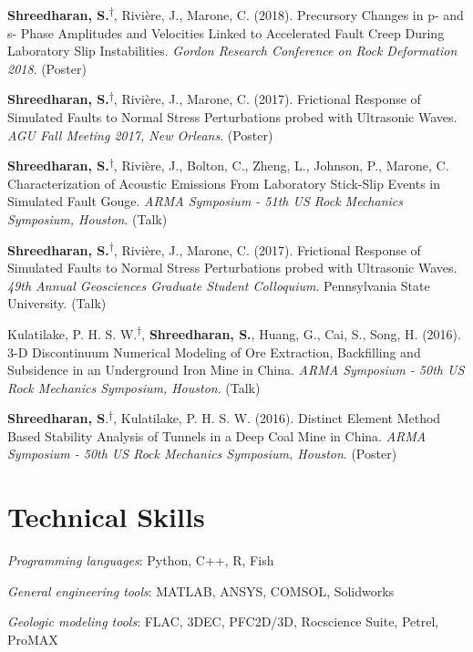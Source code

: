 \documentclass[11pt,letterpaper]{article}
\renewenvironment{itemize}{
  \begin{list}{}{
      \setlength{\leftmargin}{1.5em}
      \setlength{\itemsep}{0.25em}
      \setlength{\parskip}{0pt}
      \setlength{\parsep}{0.25em}
    }
}{
  \end{list}
}
\begin{document}
\begin{etaremune}
    \item {\bf Shreedharan, S.}\textsuperscript{$\dagger$}, Rivi\`ere, J., Marone, C. (2018). Precursory Changes in p- and s- Phase Amplitudes and Velocities Linked to Accelerated Fault Creep During Laboratory Slip Instabilities. {\em Gordon Research Conference on Rock Deformation 2018}. (Poster)
    \item {\bf Shreedharan, S.}\textsuperscript{$\dagger$}, Rivi\`ere, J., Marone, C. (2017). Frictional Response of Simulated Faults to Normal Stress Perturbations probed with Ultrasonic Waves. {\em AGU Fall Meeting 2017, New Orleans}. (Poster)
    \item {\bf Shreedharan, S.}\textsuperscript{$\dagger$}, Rivi\`ere, J., Bolton, C., Zheng, L., Johnson, P., Marone, C. Characterization of Acoustic Emissions From Laboratory Stick-Slip Events in Simulated Fault Gouge. {\em ARMA Symposium - 51th US Rock Mechanics Symposium, Houston}. (Talk)
    \item {\bf Shreedharan, S.}\textsuperscript{$\dagger$}, Rivi\`ere, J., Marone, C. (2017). Frictional Response of Simulated Faults to Normal Stress Perturbations probed with Ultrasonic Waves. {\em 49th Annual Geosciences Graduate Student Colloquium}. Pennsylvania State University. (Talk)
    \item Kulatilake, P. H. S. W.\textsuperscript{$\dagger$}, {\bf Shreedharan, S.}, Huang, G., Cai, S., Song, H. (2016). 3-D Discontinuum Numerical Modeling of Ore Extraction, Backfilling and Subsidence in an Underground Iron Mine in China. {\em ARMA Symposium - 50th US Rock Mechanics Symposium, Houston}. (Talk) 
    \item {\bf Shreedharan, S}.\textsuperscript{$\dagger$}, Kulatilake, P. H. S. W. (2016). Distinct Element Method Based Stability Analysis of Tunnels in a Deep Coal Mine in China. {\em ARMA Symposium - 50th US Rock Mechanics Symposium, Houston}. (Poster)
\end{etaremune}




\section*{Technical Skills}
\begin{itemize}
    \item {\em Programming languages}: Python, C++, R, Fish
    \item {\em General engineering tools}: MATLAB, ANSYS, COMSOL, Solidworks
    \item {\em Geologic modeling tools}: FLAC, 3DEC, PFC2D/3D, Rocscience Suite, Petrel, ProMAX
\end{itemize}
\end{document}
